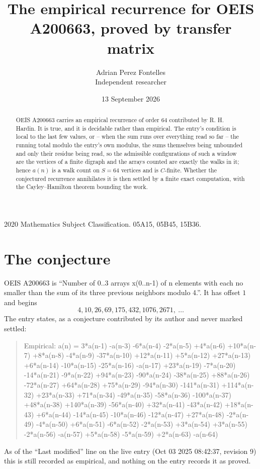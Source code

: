 \documentclass[11pt,a4paper]{article}
\title{The empirical recurrence for OEIS A200663, proved by transfer matrix}
\author{Adrian Perez Fontelles\\ \small Independent researcher}
\date{13 September 2026}
\theoremstyle{plain}
\theoremstyle{definition}
\begin{document}
\maketitle

\begin{abstract}
OEIS A200663 carries an empirical recurrence of order $64$ contributed by R. H. Hardin. It is
true, and it is decidable rather than empirical. The entry's condition is local to the last few values, or -- when the sum runs over everything read so far -- the running total modulo the entry's own modulus, the sums themselves being unbounded and only their residue being read, so
the admissible configurations of such a window are the vertices of a finite digraph and the
arrays counted are exactly the walks in it; hence $a(n)$ is a walk count on $S=64$ vertices
and is $C$-finite. Whether the conjectured recurrence annihilates it is then settled by a
finite exact computation, with the Cayley--Hamilton theorem bounding the work.
\end{abstract}

\noindent\small 2020 Mathematics Subject Classification. 05A15, 05B45, 15B36.\normalsize

\section{The conjecture}

OEIS A200663 is ``Number of 0..3 arrays x(0..n-1) of n elements with each no smaller than the sum of its three previous neighbors modulo 4.''. It has offset $1$ and begins
\[
4, 10, 26, 69, 175, 432, 1076, 2671,\ \dots
\]
The entry states, as a conjecture contributed by its author and never marked settled:
\begin{quote}
Empirical: a(n) = 3*a(n-1) -a(n-3) -6*a(n-4) -2*a(n-5) +4*a(n-6) +10*a(n-7) +8*a(n-8) -4*a(n-9) -37*a(n-10) +12*a(n-11) +5*a(n-12) +27*a(n-13) +6*a(n-14) -10*a(n-15) -25*a(n-16) -a(n-17) +23*a(n-19) -7*a(n-20) -14*a(n-21) -9*a(n-22) +94*a(n-23) -90*a(n-24) -38*a(n-25) +88*a(n-26) -72*a(n-27) +64*a(n-28) +75*a(n-29) -94*a(n-30) -141*a(n-31) +114*a(n-32) +23*a(n-33) +71*a(n-34) -49*a(n-35) -58*a(n-36) -100*a(n-37) +48*a(n-38) +140*a(n-39) -56*a(n-40) +32*a(n-41) -43*a(n-42) +18*a(n-43) +6*a(n-44) -14*a(n-45) -10*a(n-46) -12*a(n-47) +27*a(n-48) -2*a(n-49) -4*a(n-50) +6*a(n-51) -6*a(n-52) -2*a(n-53) +3*a(n-54) +3*a(n-55) -2*a(n-56) -a(n-57) +5*a(n-58) -5*a(n-59) +2*a(n-63) -a(n-64)
\end{quote}
As of the ``Last modified'' line on the live entry (Oct 03 2025 08:42:37, revision 9) this is still
recorded as empirical, and nothing on the entry records it as proved.
\end{document}

